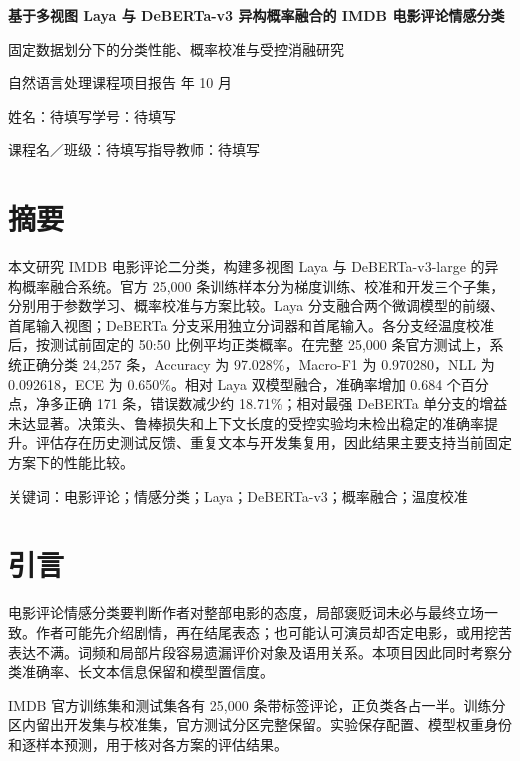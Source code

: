 \documentclass[UTF8,fontset=fandol,a4paper,11pt]{ctexart}
\begin{document}
\begin{center}
{\LARGE\bfseries 基于多视图 Laya 与 DeBERTa-v3 异构概率融合的 IMDB 电影评论情感分类}\par
\vspace{7pt}
{\normalsize 固定数据划分下的分类性能、概率校准与受控消融研究}\par
\vspace{5pt}
{\small 自然语言处理课程项目报告 年 10 月}\par
\vspace{5pt}
{\small 姓名：待填写\qquad 学号：待填写}\par
{\small 课程名／班级：待填写\qquad 指导教师：待填写}
\end{center}
\vspace{4pt}

\section*{摘要}
本文研究 IMDB 电影评论二分类，构建多视图 Laya 与 DeBERTa-v3-large 的异构概率融合系统。官方 25,000 条训练样本分为梯度训练、校准和开发三个子集，分别用于参数学习、概率校准与方案比较。Laya 分支融合两个微调模型的前缀、首尾输入视图；DeBERTa 分支采用独立分词器和首尾输入。各分支经温度校准后，按测试前固定的 50:50 比例平均正类概率。在完整 25,000 条官方测试上，系统正确分类 24,257 条，Accuracy 为 97.028\%，Macro-F1 为 0.970280，NLL 为 0.092618，ECE 为 0.650\%。相对 Laya 双模型融合，准确率增加 0.684 个百分点，净多正确 171 条，错误数减少约 18.71\%；相对最强 DeBERTa 单分支的增益未达显著。决策头、鲁棒损失和上下文长度的受控实验均未检出稳定的准确率提升。评估存在历史测试反馈、重复文本与开发集复用，因此结果主要支持当前固定方案下的性能比较。

关键词：电影评论；情感分类；Laya；DeBERTa-v3；概率融合；温度校准

\section{引言}
电影评论情感分类要判断作者对整部电影的态度，局部褒贬词未必与最终立场一致。作者可能先介绍剧情，再在结尾表态；也可能认可演员却否定电影，或用挖苦表达不满。词频和局部片段容易遗漏评价对象及语用关系。本项目因此同时考察分类准确率、长文本信息保留和模型置信度。

IMDB 官方训练集和测试集各有 25,000 条带标签评论，正负类各占一半\cite{maas}。训练分区内留出开发集与校准集，官方测试分区完整保留。实验保存配置、模型权重身份和逐样本预测，用于核对各方案的评估结果。
\end{document}
